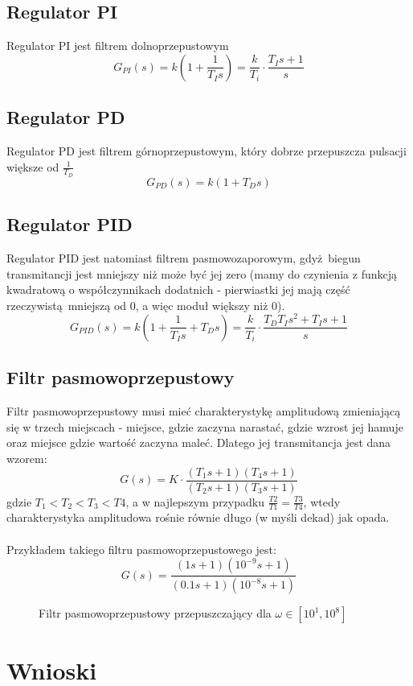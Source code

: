 \documentclass[a4paper, 12pt]{article}
\begin{document}
		\subsection{Regulator PI}
			Regulator PI jest filtrem dolnoprzepustowym
			$$
				G_{PI}(s) = k\left(1 + \frac{1}{T_Is}\right) = \frac{k}{T_i} \cdot\frac{T_Is + 1}{s}
			$$
		\subsection{Regulator PD}
			Regulator PD jest filtrem górnoprzepustowym, który dobrze przepuszcza pulsacji większe od $ \frac{1}{T_D}$
			$$
				G_{PD}(s) = k\left(1 + T_Ds\right)
			$$
		\subsection{Regulator PID}
			Regulator PID jest natomiast filtrem pasmowozaporowym, gdyż biegun transmitancji jest mniejszy niż może być jej zero (mamy do czynienia z funkcją kwadratową o współczynnikach dodatnich - pierwiastki jej mają część rzeczywistą mniejszą od 0, a więc moduł większy niż 0). 
			$$
				G_{PID}(s) = k\left(1 + \frac{1}{T_Is} + T_Ds\right) = \frac{k}{T_i}
					\cdot \frac{T_DT_Is^2 + T_Is + 1}{s}
			$$
		\subsection{Filtr pasmowoprzepustowy}
			Filtr pasmowoprzepustowy musi mieć charakterystykę amplitudową zmieniającą się w trzech miejscach - miejsce, gdzie zaczyna narastać, gdzie wzrost jej hamuje oraz miejsce gdzie wartość zaczyna maleć. Dlatego jej transmitancja jest dana wzorem:
			$$
				G(s) = K\cdot\frac{(T_1 s + 1)(T_4 s + 1)}{(T_2 s + 1)(T_3 s + 1)}
			$$
			gdzie $T_1 < T_2 < T_3 < T4$, a w najlepszym przypadku $\frac{T2}{T1} = \frac{T3}{T4}$, wtedy charakterystyka amplitudowa rośnie równie długo (w myśli dekad) jak opada.
			\\ \\
			Przykładem takiego filtru pasmowoprzepustowego jest:
			$$
				G(s) = \frac{(1 s + 1)(10^{-9} s + 1)}{(0.1 s + 1)(10^{-8} s + 1)}
			$$
			\begin{figure}[H]
				\centering
				\def \svgwidth{0.8\columnwidth}
				
				\caption{Filtr pasmowoprzepustowy przepuszczający dla $\omega \in [10^1, 10^8]$}
			\end{figure}\noindent
	\section{Wnioski}
		
\end{document}
